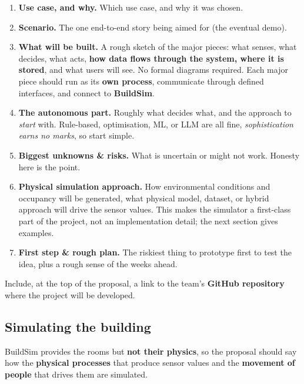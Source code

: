\documentclass[
  11pt,
]{article}
\providecommand{\tightlist}{%
  \setlength{\itemsep}{0pt}\setlength{\parskip}{0pt}}
\begin{document}
\begin{enumerate}
\def\labelenumi{\arabic{enumi}.}
\tightlist
\item
  \textbf{Use case, and why.} Which use case, and why it was chosen.
\item
  \textbf{Scenario.} The one end-to-end story being aimed for (the
  eventual demo).
\item
  \textbf{What will be built.} A rough sketch of the major pieces: what
  senses, what decides, what acts, \textbf{how data flows through the
  system, where it is stored}, and what users will see. No formal
  diagrams required. Each major piece should run as its \textbf{own
  process}, communicate through defined interfaces, and connect to
  \textbf{BuildSim}.
\item
  \textbf{The autonomous part.} Roughly what decides what, and the
  approach to \emph{start} with. Rule-based, optimisation, ML, or
  LLM are all fine, \emph{sophistication earns no marks}, so start
  simple.
\item
  \textbf{Biggest unknowns \& risks.} What is uncertain or might not
  work. Honesty here is the point.
\item
  \textbf{Physical simulation approach.} How environmental conditions
  and occupancy will be generated, what physical model, dataset, or
  hybrid approach will drive the sensor values. This makes the
  simulator a first-class part of the project, not an implementation
  detail; the next section gives examples.
\item
  \textbf{First step \& rough plan.} The riskiest thing to prototype
  first to test the idea, plus a rough sense of the weeks ahead.
\end{enumerate}

Include, at the top of the proposal, a link to the team's
\textbf{GitHub repository} where the project will be developed.

\hypertarget{simulating-the-building}{%
\subsection{Simulating the building}\label{simulating-the-building}}

BuildSim provides the rooms but \textbf{not their physics}, so the
proposal should say how the \textbf{physical processes} that produce
sensor values and the \textbf{movement of people} that drives them are
simulated.
\end{document}
